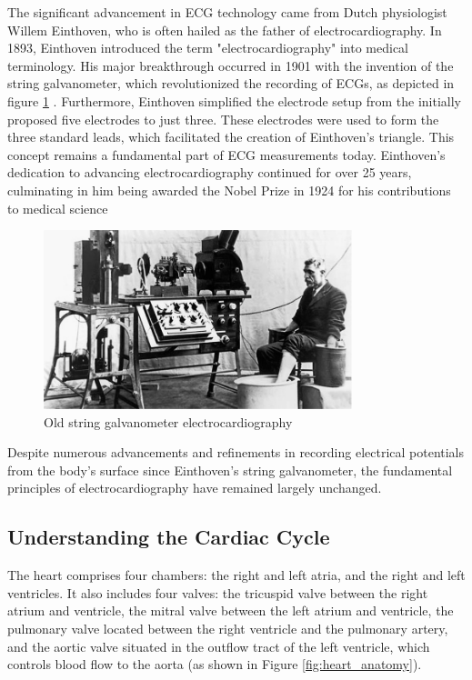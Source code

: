 \noindent The significant advancement in ECG technology came from Dutch physiologist Willem Einthoven, who is often hailed as the father of electrocardiography. In 1893, Einthoven introduced the term "electrocardiography" into medical terminology. His major breakthrough occurred in 1901 with the invention of the string galvanometer, which revolutionized the recording of ECGs, as depicted in figure \ref{fig:einthoven_machine} . Furthermore, Einthoven simplified the electrode setup from the initially proposed five electrodes to just three. These electrodes were used to form the three standard leads, which facilitated the creation of Einthoven's triangle. This concept remains a fundamental part of ECG measurements today. Einthoven's dedication to advancing electrocardiography continued for over 25 years, culminating in him being awarded the Nobel Prize in 1924 for his contributions to medical science~\cite{alghatrif2012}~\cite{yang2015}

\begin{figure}[tb]
	\centering
	\includegraphics[width=0.8\textwidth]{images/einthoven_machine}
	\caption{Old string galvanometer electrocardiography~\cite{alghatrif2012}}
	\label{fig:einthoven_machine}
\end{figure}

\vspace{1em}

\noindent Despite numerous advancements and refinements in recording electrical potentials from the body's surface since Einthoven's string galvanometer, the fundamental principles of electrocardiography have remained largely unchanged.
\vspace{1em}


\subsection{Understanding the Cardiac Cycle}
\vspace{1em}
\noindent The heart comprises four chambers: the right and left atria, and the right and left ventricles. It also includes four valves: the tricuspid valve between the right atrium and ventricle, the mitral valve between the left atrium and ventricle, the pulmonary valve located between the right ventricle and the pulmonary artery, and the aortic valve situated in the outflow tract of the left ventricle, which controls blood flow to the aorta \cite{malminen1995} (as shown in Figure \ref{fig:heart_anatomy}).\\

